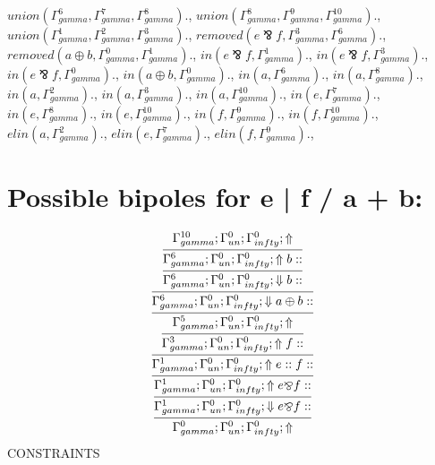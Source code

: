 \documentclass[a4paper, 11pt]{article}
\begin{document}
$union(\Gamma_{gamma}^{6}, \Gamma_{gamma}^{7}, \Gamma_{gamma}^{8}).$, $union(\Gamma_{gamma}^{8}, \Gamma_{gamma}^{9}, \Gamma_{gamma}^{10}).$, $union(\Gamma_{gamma}^{1}, \Gamma_{gamma}^{2}, \Gamma_{gamma}^{3}).$, $removed(e \bindnasrepma f, \Gamma_{gamma}^{3}, \Gamma_{gamma}^{6}).$, $removed(a \oplus b, \Gamma_{gamma}^{0}, \Gamma_{gamma}^{1}).$, $in(e \bindnasrepma f, \Gamma_{gamma}^{1}).$, $in(e \bindnasrepma f, \Gamma_{gamma}^{3}).$, $in(e \bindnasrepma f, \Gamma_{gamma}^{0}).$, $in(a \oplus b, \Gamma_{gamma}^{0}).$, $in(a, \Gamma_{gamma}^{6}).$, $in(a, \Gamma_{gamma}^{8}).$, $in(a, \Gamma_{gamma}^{2}).$, $in(a, \Gamma_{gamma}^{3}).$, $in(a, \Gamma_{gamma}^{10}).$, $in(e, \Gamma_{gamma}^{7}).$, $in(e, \Gamma_{gamma}^{8}).$, $in(e, \Gamma_{gamma}^{10}).$, $in(f, \Gamma_{gamma}^{9}).$, $in(f, \Gamma_{gamma}^{10}).$, $elin(a, \Gamma_{gamma}^{2}).$, $elin(e, \Gamma_{gamma}^{7}).$, $elin(f, \Gamma_{gamma}^{9}).$, 
\section{Possible bipoles for e | f / a + b:} 

\[
\infer{\Gamma_{ gamma}^{0} ; \Gamma_{un}^{0} ; \Gamma_{ infty}^{0} ;  \Uparrow }
{\infer{\Gamma_{ gamma}^{1} ; \Gamma_{un}^{0} ; \Gamma_{ infty}^{0} ;  \Downarrow e \bindnasrepma f :: }
{\infer{\Gamma_{ gamma}^{1} ; \Gamma_{un}^{0} ; \Gamma_{ infty}^{0} ;  \Uparrow e \bindnasrepma f :: }
{\infer{\Gamma_{ gamma}^{1} ; \Gamma_{un}^{0} ; \Gamma_{ infty}^{0} ;  \Uparrow e :: f :: }
{\infer{\Gamma_{ gamma}^{3} ; \Gamma_{un}^{0} ; \Gamma_{ infty}^{0} ;  \Uparrow f :: }
{\infer{\Gamma_{ gamma}^{5} ; \Gamma_{un}^{0} ; \Gamma_{ infty}^{0} ;  \Uparrow }
{\infer{\Gamma_{ gamma}^{6} ; \Gamma_{un}^{0} ; \Gamma_{ infty}^{0} ;  \Downarrow a \oplus b :: }
{\infer{\Gamma_{ gamma}^{6} ; \Gamma_{un}^{0} ; \Gamma_{ infty}^{0} ;  \Downarrow b :: }
{\infer{\Gamma_{ gamma}^{6} ; \Gamma_{un}^{0} ; \Gamma_{ infty}^{0} ;  \Uparrow b :: }
{\Gamma_{ gamma}^{10} ; \Gamma_{un}^{0} ; \Gamma_{ infty}^{0} ;  \Uparrow }}}}}}}}}
\]
CONSTRAINTS
\end{document}
